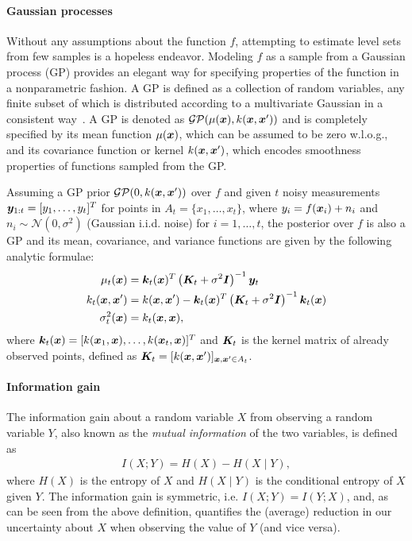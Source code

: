 \paragraph{Gaussian processes}
 Without any assumptions about the function $f$, attempting to estimate level sets from few samples is a hopeless endeavor.
Modeling $f$ as a sample from a Gaussian process
(GP) provides an elegant way for specifying properties of the function in a
nonparametric fashion. A GP is defined as a collection of random variables,
any finite subset of which is distributed according to a
multivariate Gaussian in a consistent way~\cite{rasmussen06}. A GP is
denoted as $\mathcal{GP}(\mu(\bm{x}), k(\bm{x}, \bm{x}'))$ and is
completely specified by its mean function $\mu(\bm{x})$, which can be
assumed to be zero w.l.o.g., and its covariance function or kernel
$k(\bm{x}, \bm{x}')$, which encodes smoothness properties of functions sampled
from the GP.

Assuming a GP prior $\mathcal{GP}(0, k(\bm{x}, \bm{x}'))$ over $f$ and given
$t$ noisy measurements $\bm{y}_{1:t} = [y_1,\ldots,y_t]^T$ for
points in $A_t = \{x_1,\ldots,x_t\}$,
where $y_i = f(\bm{x}_i) + n_i$ and
${n_i \sim \mathcal{N}(0, \sigma^2)}$ (Gaussian i.i.d. noise)
for $i = 1,\ldots,t$, the posterior over $f$ is also a
GP and its mean, covariance, and variance functions are given by the
following analytic formulae:
\begin{align}
\mu_t(\bm{x}) &= \bm{k}_t(\bm{x})^T\left(\bm{K}_t + \sigma^2 \bm{I}\right)^{-1}\bm{y}_t\label{eq:mean}\\
k_t(\bm{x}, \bm{x}') &= k(\bm{x}, \bm{x}') - \bm{k}_t(\bm{x})^T\left(\bm{K}_t + \sigma^2 \bm{I}\right)^{-1}\bm{k}_t(\bm{x})\notag\\
\sigma_t^2(\bm{x}) &= k_t(\bm{x}, \bm{x})\label{eq:var},
\end{align}
where $\bm{k}_t(\bm{x}) = [k(\bm{x}_1, \bm{x}),\ldots,k(\bm{x}_t, \bm{x})]^T$ and $\bm{K}_t$ is
the kernel matrix of already observed points, defined as
${\bm{K}_t = [k(\bm{x}, \bm{x}')]_{\bm{x}, \bm{x}'\in A_t}}$.

\paragraph{Information gain}
The information gain about a random variable $X$ from observing a random
variable $Y$, also known as the \emph{mutual information} of the two variables,
is defined as~\cite{cover06}
\begin{align*}
I(X; Y) = H(X) - H(X\mid Y),
\end{align*}
where $H(X)$ is the entropy of $X$ and $H(X\mid Y)$ is the conditional
entropy of $X$ given $Y$.
The information gain is symmetric, i.e. $I(X; Y) = I(Y; X)$, and,
as can be seen from the above definition, quantifies the (average) reduction
in our uncertainty about $X$ when observing the value of $Y$ (and vice
versa).

